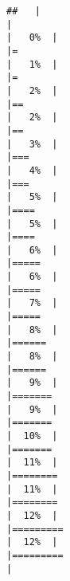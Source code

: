 \documentclass[
]{article}
\begin{document}
\begin{verbatim}
##   |                                                                              |                                                                      |   0%  |                                                                              |=                                                                     |   1%  |                                                                              |=                                                                     |   2%  |                                                                              |==                                                                    |   2%  |                                                                              |==                                                                    |   3%  |                                                                              |===                                                                   |   4%  |                                                                              |===                                                                   |   5%  |                                                                              |====                                                                  |   5%  |                                                                              |====                                                                  |   6%  |                                                                              |=====                                                                 |   6%  |                                                                              |=====                                                                 |   7%  |                                                                              |=====                                                                 |   8%  |                                                                              |======                                                                |   8%  |                                                                              |======                                                                |   9%  |                                                                              |=======                                                               |   9%  |                                                                              |=======                                                               |  10%  |                                                                              |=======                                                               |  11%  |                                                                              |========                                                              |  11%  |                                                                              |========                                                              |  12%  |                                                                              |=========                                                             |  12%  |                                                                              |=========                                                             |  
\end{verbatim}
\end{document}
